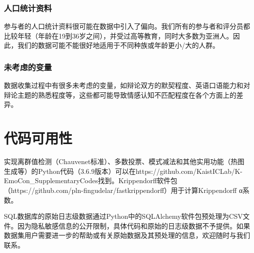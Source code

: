 \subsubsection{人口统计资料}
参与者的人口统计资料很可能在数据中引入了偏向。我们所有的参与者和评分员都比较年轻（年龄在19到36岁之间），并受过高等教育，同时大多数为亚洲人。因此，我们的数据可能不能很好地适用于不同种族或年龄更小/大的人群。
\subsubsection{未考虑的变量}
数据收集过程中有很多未考虑的变量，如辩论双方的默契程度、英语口语能力和对辩论主题的熟悉程度等，这些都可能导致情感认知不匹配程度在各个方面上的差异。
\section{代码可用性}
实现离群值检测（Chauvenet标准）、多数投票、模式减法和其他实用功能（热图生成等）的Python代码（3.6.9版本）可以在https://github.com/KaistICLab/K-EmoCon\_SupplementaryCodes找到。Krippendorff软件包（https://github.com/pln-fingudelar/fastkrippendorff）用于计算Krippendorff α系数。

SQL数据库的原始日志级数据通过Python中的SQLAlchemy软件包预处理为CSV文件。因为隐私敏感信息的公开限制，具体代码和原始的日志级数据不予提供。如果数据集用户需要进一步的帮助或有关原始数据及其预处理的信息，欢迎随时与我们联系。
